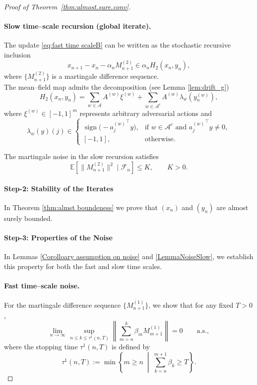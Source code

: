 \documentclass{article}
\begin{document}
\begin{proof}[Proof of Theorem~\ref{thm:almost.sure.conv}]
\paragraph{Slow time--scale recursion (global iterate).}
The update \eqref{eq:fast time scaleB} can be written as the stochastic recursive inclusion
\begin{equation}
x_{n+1} - x_n - \alpha_n M_{n+1}^{(2)}
\in \alpha_n H_2(x_n,y_n),
\label{eq:sa_slow_form}
\end{equation}
where \(\{M_{n+1}^{(2)}\}\) is a martingale difference sequence.
\\ The mean--field map admits the decomposition (see   Lemma \ref{lem:drift_g})
\begin{equation}
H_2(x_n,y_n)
=
\sum_{w\in\mathcal A} A^{(w)} \xi^{(w)}
+
\sum_{w\in\mathcal A^c}
A^{(w)} \lambda_w(y_n^{(w)}),
\label{eq:H2_def}
\end{equation}
where \(\xi^{(w)}\in[-1,1]^m\) represents arbitrary adversarial actions and
\[
\lambda_w(y)(j)\in
\begin{cases}
\operatorname{sign}\!\big(-{a_j^{(w)}}^\top y\big),
& \text{if } w\in\mathcal A^c \text{ and } {a_j^{(w)}}^\top y\neq 0,
\\[4pt]
[-1,1],
& \text{otherwise}.
\end{cases}
\]

The martingale noise in the slow recursion satisfies
\begin{equation}
\mathbb{E}\!\left[\|M_{n+1}^{(2)}\|^2 \mid \mathcal F_n\right]
\le K,
\qquad K>0.
\label{eq:noise_slow}
\end{equation}

\paragraph{Step-2: Stability of the Iterates} In Theorem \ref{thm:almst boundeness} we prove that $(x_n)$ and $(y_n)$ are almost surely bounded. 
\paragraph{Step-3: Properties of the Noise}
In Lemmas \ref{Corolloary assumption on noise} and \ref{LemmaNoiseSlow}, we establish this property for both the fast and slow time scales.

\paragraph{Fast time--scale noise.}
For the martingale difference sequence \(\{M_{n+1}^{(1)}\}\), we show that for any fixed \(T>0\),
\begin{equation}
\lim_{n\to\infty}
\sup_{\, n\le k\le \tau^1(n,T)}
\left\|
\sum_{m=n}^{k}\beta_m M_{m+1}^{(1)}
\right\|
=0
\qquad \text{a.s.},
\label{eq:noise_fast_vanish}
\end{equation}
where the stopping time \(\tau^1(n,T)\) is defined by
\begin{equation}
\tau^1(n,T)
:=
\min\left\{
m\ge n \;\middle|\;
\sum_{k=n}^{m+1}\beta_k \ge T
\right\}.
\label{eq:tau_fast}
\end{equation}


\end{proof}
\end{document}
